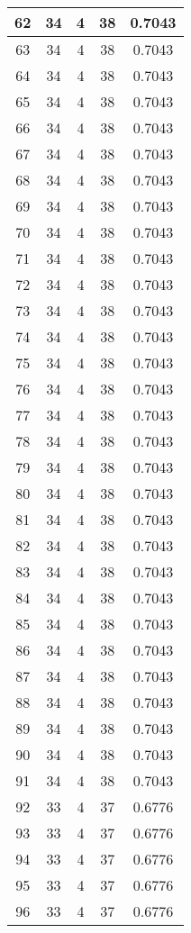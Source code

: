 \documentclass[letterpaper, 12pt]{article}
\begin{document}
\begin{longtable}{|c|c|c|c|c|}
\hline
62 & 34 & 4 & 38 & 0.7043 \\
\hline
63 & 34 & 4 & 38 & 0.7043 \\
\hline
64 & 34 & 4 & 38 & 0.7043 \\
\hline
65 & 34 & 4 & 38 & 0.7043 \\
\hline
66 & 34 & 4 & 38 & 0.7043 \\
\hline
67 & 34 & 4 & 38 & 0.7043 \\
\hline
68 & 34 & 4 & 38 & 0.7043 \\
\hline
69 & 34 & 4 & 38 & 0.7043 \\
\hline
70 & 34 & 4 & 38 & 0.7043 \\
\hline
71 & 34 & 4 & 38 & 0.7043 \\
\hline
72 & 34 & 4 & 38 & 0.7043 \\
\hline
73 & 34 & 4 & 38 & 0.7043 \\
\hline
74 & 34 & 4 & 38 & 0.7043 \\
\hline
75 & 34 & 4 & 38 & 0.7043 \\
\hline
76 & 34 & 4 & 38 & 0.7043 \\
\hline
77 & 34 & 4 & 38 & 0.7043 \\
\hline
78 & 34 & 4 & 38 & 0.7043 \\
\hline
79 & 34 & 4 & 38 & 0.7043 \\
\hline
80 & 34 & 4 & 38 & 0.7043 \\
\hline
81 & 34 & 4 & 38 & 0.7043 \\
\hline
82 & 34 & 4 & 38 & 0.7043 \\
\hline
83 & 34 & 4 & 38 & 0.7043 \\
\hline
84 & 34 & 4 & 38 & 0.7043 \\
\hline
85 & 34 & 4 & 38 & 0.7043 \\
\hline
86 & 34 & 4 & 38 & 0.7043 \\
\hline
87 & 34 & 4 & 38 & 0.7043 \\
\hline
88 & 34 & 4 & 38 & 0.7043 \\
\hline
89 & 34 & 4 & 38 & 0.7043 \\
\hline
90 & 34 & 4 & 38 & 0.7043 \\
\hline
91 & 34 & 4 & 38 & 0.7043 \\
\hline
92 & 33 & 4 & 37 & 0.6776 \\
\hline
93 & 33 & 4 & 37 & 0.6776 \\
\hline
94 & 33 & 4 & 37 & 0.6776 \\
\hline
95 & 33 & 4 & 37 & 0.6776 \\
\hline
96 & 33 & 4 & 37 & 0.6776 \\

\end{longtable}
\end{document}
